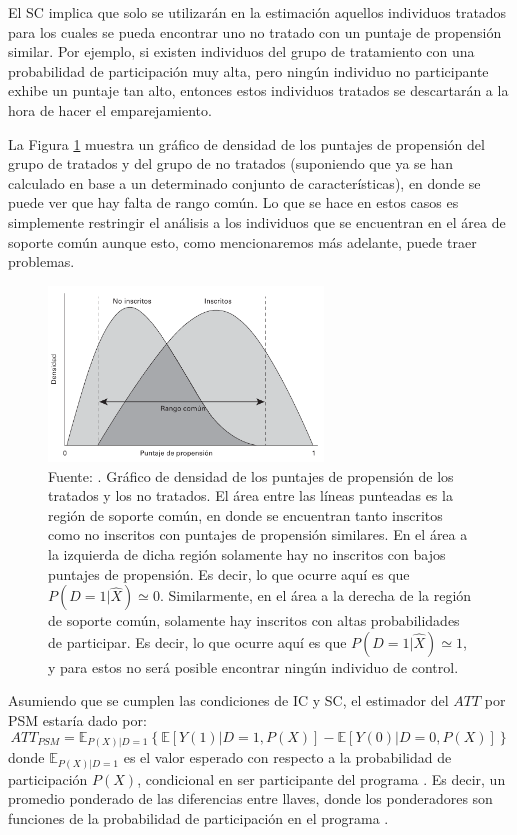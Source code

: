 \documentclass[../../main.tex]{subfiles}
\begin{document}
El SC implica que solo se utilizarán en la estimación aquellos individuos tratados para
los cuales se pueda encontrar uno no tratado con un puntaje de propensión similar. Por
ejemplo, si existen individuos del grupo de tratamiento con una probabilidad de
participación muy alta, pero ningún individuo no participante exhibe un puntaje tan alto,
entonces estos individuos tratados se descartarán a la hora de hacer el emparejamiento.

La Figura \ref{fig:common-support} muestra un gráfico de densidad de los puntajes de
propensión del grupo de tratados y del grupo de no tratados (suponiendo que ya se han
calculado en base a un determinado conjunto de características), en donde se puede ver que
hay falta de rango común. Lo que se hace en estos casos es simplemente restringir el
análisis a los individuos que se encuentran en el área de soporte común aunque esto, como
mencionaremos más adelante, puede traer problemas.

\begin{figure}[ht]
    \centering
    \includegraphics[width=0.65\textwidth]{figs/soporte-comun.png}
    \caption{Fuente: \cite{gertler-2016}. Gráfico de densidad de los puntajes de
    propensión de los tratados y los no tratados. El área entre las líneas punteadas es la
    región de soporte común, en donde se encuentran tanto inscritos como no inscritos con
    puntajes de propensión similares. En el área a la izquierda de dicha región solamente
    hay no inscritos con bajos puntajes de propensión. Es decir, lo que ocurre aquí es que
    \(P(D=1|\hat{X}) \simeq 0\). Similarmente, en el área a la derecha de la región de
    soporte común, solamente hay inscritos con altas probabilidades de participar. Es
    decir, lo que ocurre aquí es que \(P(D=1|\hat{X}) \simeq 1\), y para estos no será
    posible encontrar ningún individuo de control.}
    \label{fig:common-support}
\end{figure}

Asumiendo que se cumplen las condiciones de IC y SC, el estimador del \(ATT\) por PSM
estaría dado por:
\begin{equation}
ATT_{PSM} = \mathbb{E}_{P(X)|D=1}
    \left\{
        \mathbb{E}\left[Y(1)|D=1, P(X)\right] - \mathbb{E}\left[Y(0)|D=0, P(X)\right]
    \right\}
    \label{ATT-PSM}
\end{equation}
donde \(\mathbb{E}_{P(X)|D=1}\) es el valor esperado con respecto a la probabilidad de
participación \(P(X)\), condicional en ser participante del programa \cite{bernal}. Es
decir, un promedio ponderado de las diferencias entre llaves, donde los ponderadores
son funciones de la probabilidad de participación en el programa \cite{bernal}.
\end{document}
